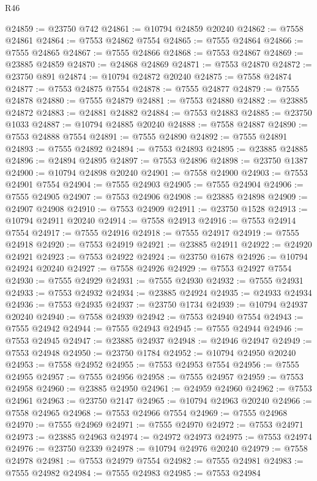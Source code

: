 \begin{lexlean}{R46}
\begin{coremodule}
@24859 := @23750 @742
@24861 := @10794 @24859 @20240
@24862 := @7558 @24861
@24864 := @7553 @24862 @7554
@24865 := @7555 @24864
@24866 := @7555 @24865
@24867 := @7555 @24866
@24868 := @7553 @24867
@24869 := @23885 @24859
@24870 := @24868 @24869
@24871 := @7553 @24870
@24872 := @23750 @891
@24874 := @10794 @24872 @20240
@24875 := @7558 @24874
@24877 := @7553 @24875 @7554
@24878 := @7555 @24877
@24879 := @7555 @24878
@24880 := @7555 @24879
@24881 := @7553 @24880
@24882 := @23885 @24872
@24883 := @24881 @24882
@24884 := @7553 @24883
@24885 := @23750 @1033
@24887 := @10794 @24885 @20240
@24888 := @7558 @24887
@24890 := @7553 @24888 @7554
@24891 := @7555 @24890
@24892 := @7555 @24891
@24893 := @7555 @24892
@24894 := @7553 @24893
@24895 := @23885 @24885
@24896 := @24894 @24895
@24897 := @7553 @24896
@24898 := @23750 @1387
@24900 := @10794 @24898 @20240
@24901 := @7558 @24900
@24903 := @7553 @24901 @7554
@24904 := @7555 @24903
@24905 := @7555 @24904
@24906 := @7555 @24905
@24907 := @7553 @24906
@24908 := @23885 @24898
@24909 := @24907 @24908
@24910 := @7553 @24909
@24911 := @23750 @1528
@24913 := @10794 @24911 @20240
@24914 := @7558 @24913
@24916 := @7553 @24914 @7554
@24917 := @7555 @24916
@24918 := @7555 @24917
@24919 := @7555 @24918
@24920 := @7553 @24919
@24921 := @23885 @24911
@24922 := @24920 @24921
@24923 := @7553 @24922
@24924 := @23750 @1678
@24926 := @10794 @24924 @20240
@24927 := @7558 @24926
@24929 := @7553 @24927 @7554
@24930 := @7555 @24929
@24931 := @7555 @24930
@24932 := @7555 @24931
@24933 := @7553 @24932
@24934 := @23885 @24924
@24935 := @24933 @24934
@24936 := @7553 @24935
@24937 := @23750 @1734
@24939 := @10794 @24937 @20240
@24940 := @7558 @24939
@24942 := @7553 @24940 @7554
@24943 := @7555 @24942
@24944 := @7555 @24943
@24945 := @7555 @24944
@24946 := @7553 @24945
@24947 := @23885 @24937
@24948 := @24946 @24947
@24949 := @7553 @24948
@24950 := @23750 @1784
@24952 := @10794 @24950 @20240
@24953 := @7558 @24952
@24955 := @7553 @24953 @7554
@24956 := @7555 @24955
@24957 := @7555 @24956
@24958 := @7555 @24957
@24959 := @7553 @24958
@24960 := @23885 @24950
@24961 := @24959 @24960
@24962 := @7553 @24961
@24963 := @23750 @2147
@24965 := @10794 @24963 @20240
@24966 := @7558 @24965
@24968 := @7553 @24966 @7554
@24969 := @7555 @24968
@24970 := @7555 @24969
@24971 := @7555 @24970
@24972 := @7553 @24971
@24973 := @23885 @24963
@24974 := @24972 @24973
@24975 := @7553 @24974
@24976 := @23750 @2339
@24978 := @10794 @24976 @20240
@24979 := @7558 @24978
@24981 := @7553 @24979 @7554
@24982 := @7555 @24981
@24983 := @7555 @24982
@24984 := @7555 @24983
@24985 := @7553 @24984

\end{coremodule}
\end{lexlean}
